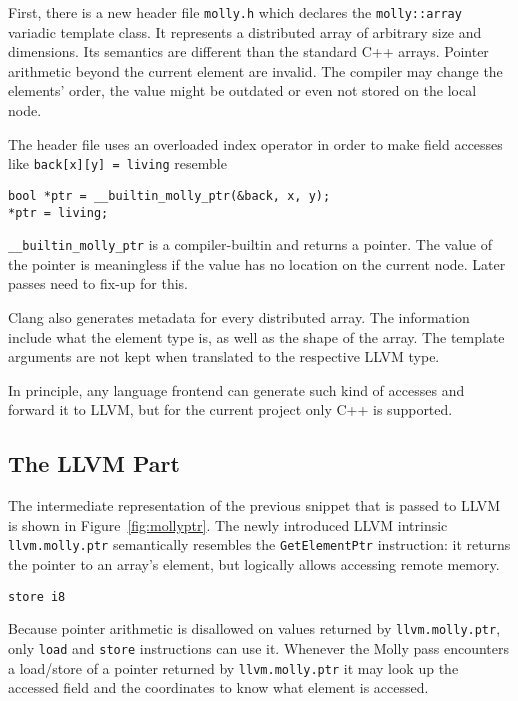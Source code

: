 \documentclass{sigplanconf}
\newcommand{\dquote}[1]{``#1''}
\begin{document}
First, there is a new header file \texttt{molly.h} which declares the \texttt{molly::array} variadic template class. It represents a distributed array of arbitrary size and dimensions. Its semantics are different than the standard C++ arrays. Pointer arithmetic beyond the current element are invalid. The compiler may change the elements' order, the value might be outdated or even not stored on the local node.

The header file uses an overloaded index operator in order to make field accesses like \texttt{back[x][y] = living} resemble

\begin{verbatim}
bool *ptr = __builtin_molly_ptr(&back, x, y);
*ptr = living;
\end{verbatim}


\texttt{\_\_builtin\_molly\_ptr} is a compiler-builtin and returns a pointer. The value of the pointer is meaningless if the value has no location on the current node. Later passes need to fix-up for this.
  
Clang also generates metadata for every distributed array. The information include what the element type is, as well as the shape of the array. The template arguments are not kept when translated to the respective LLVM type. 

In principle, any language frontend can generate such kind of accesses and forward it to LLVM, but for the current project only C++ is supported.


\subsection{The LLVM Part}

The intermediate representation of the previous snippet that is passed to LLVM is shown in Figure~\ref{fig:mollyptr}. The newly introduced LLVM intrinsic \texttt{llvm.molly.ptr} semantically resembles the \texttt{GetElementPtr} instruction: it returns the pointer to an array's element, but logically allows accessing remote memory.

\begin{figure*}
\begin{verbatim}
store i8 \end{verbatim}
\caption{Equivalent LLVM IR code of \dquote{\texttt{back[x][y] = living}}}\label{fig:mollyptr}
\end{figure*}


Because pointer arithmetic is disallowed on values returned by \texttt{llvm.molly.ptr}, only \texttt{load} and \texttt{store} instructions can use it. Whenever the Molly pass encounters a load/store of a pointer returned by \texttt{llvm.molly.ptr} it may look up the accessed field and the coordinates to know what element is accessed.
\end{document}
